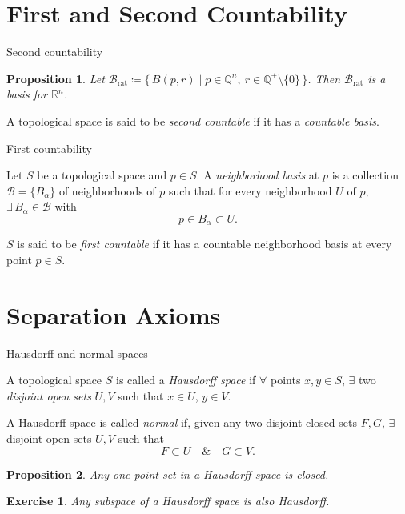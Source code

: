 \documentclass[10pt]{beamer}
\newtheorem{proposition}{Proposition}
\newtheorem{exercise}{Exercise}
\newcommand{\R}{\mathbb{R}}
\newcommand{\Q}{\mathbb{Q}}
\newcommand{\B}{\mathcal{B}}
\begin{document}
\section{First and Second Countability}

\begin{frame}{Second countability}
	\begin{proposition}
		Let
		$\B_{\mathrm{rat}} \coloneqq \{\, B(p,r) \mid p \in \Q^n,\ r \in \Q^{+} \setminus \{0\} \,\}$.
		Then $\B_{\mathrm{rat}}$ is a basis for $\R^n$.
	\end{proposition}
	\begin{definition}
		A topological space is said to be \emph{second countable} if it has a
		\emph{countable basis}.
	\end{definition}
\end{frame}

\begin{frame}{First countability}
	\begin{definition}
		Let $S$ be a topological space and $p \in S$. A \emph{neighborhood basis}
		at $p$ is a collection $\B = \{B_\alpha\}$ of neighborhoods of $p$ such
		that for every neighborhood $U$ of $p$, $\exists\, B_\alpha \in \B$ with
		\[
			p \in B_\alpha \subset U.
		\]
	\end{definition}
	\begin{definition}
		$S$ is said to be \emph{first countable} if it has a countable
		neighborhood basis at every point $p \in S$.
	\end{definition}
\end{frame}

\section{Separation Axioms}

\begin{frame}{Hausdorff and normal spaces}
	\begin{definition}
		A topological space $S$ is called a \emph{Hausdorff space} if
		$\forall$ points $x, y \in S$, $\exists$ two \emph{disjoint open sets}
		$U, V$ such that $x \in U$, $y \in V$.
	\end{definition}
	\begin{definition}
		A Hausdorff space is called \emph{normal} if, given any two disjoint
		closed sets $F, G$, $\exists$ disjoint open sets $U, V$ such that
		\[
			F \subset U \quad \& \quad G \subset V.
		\]
	\end{definition}
	\begin{proposition}
		Any one-point set in a Hausdorff space is closed.
	\end{proposition}
	\begin{exercise}
		Any subspace of a Hausdorff space is also Hausdorff.
	\end{exercise}
\end{frame}
\end{document}

